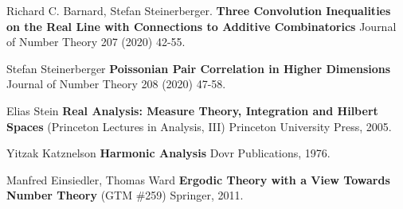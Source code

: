 \documentclass[12pt]{article}
\begin{document}
\begin{thebibliography}{}
\item Richard C. Barnard, Stefan Steinerberger.  \textbf{Three Convolution Inequalities on the Real Line with Connections to Additive Combinatorics} Journal of Number Theory 207 (2020) 42-55.

\item Stefan Steinerberger \textbf{Poissonian Pair Correlation in Higher Dimensions} \\ Journal of Number Theory 208 (2020) 47-58.
\item Elias Stein \textbf{Real Analysis: Measure Theory, Integration and Hilbert Spaces} (Princeton Lectures in Analysis, III) Princeton University Press, 2005.
\item Yitzak Katznelson \textbf{Harmonic Analysis} Dovr Publications, 1976.
\item Manfred Einsiedler, Thomas Ward \textbf{Ergodic Theory with a View Towards Number Theory} (GTM \#259) Springer, 2011.
\end{thebibliography}
\end{document}
